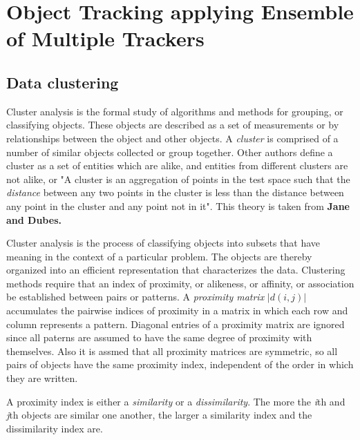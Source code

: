 
\chapter{Object Tracking applying Ensemble of Multiple Trackers} %

\label{Chapter3} %


\section{Data clustering}

Cluster analysis is the formal study of algorithms and methods for grouping, or classifying objects. These objects are described as a set of measurements or by relationships between the object and other objects. A \textit{cluster} is comprised of a number of similar objects collected or group together. Other authors define a cluster as a set of entities which are alike, and entities from different clusters are not alike, or "A cluster is an aggregation of points in the test space such that the \textit{distance} between any two points in the cluster is less than the distance between any point in the cluster and any point not in it". This theory is taken from \textbf{Jane and Dubes.}

Cluster analysis is the process of classifying objects into subsets that have meaning in the context of a particular problem. The objects are thereby organized into an efficient representation that characterizes the data. Clustering methods require that an index of proximity, or alikeness, or affinity, or association be established between pairs or patterns. A \textit{proximity matrix} $|d(i, j)|$ accumulates the pairwise indices of proximity in a matrix in which each row and column represents a pattern. Diagonal entries of a proximity matrix are ignored since all paterns are assumed to have the same degree of proximity with themselves. Also it is assmed that all proximity matrices are symmetric, so all pairs of objects have the same proximity index, independent of the order in which they are written.

A proximity index is either a \textit{similarity} or a \textit{dissimilarity}. The more the \textit{i}th and \textit{j}th objects are similar one another, the larger a similarity index and the dissimilarity index are.

